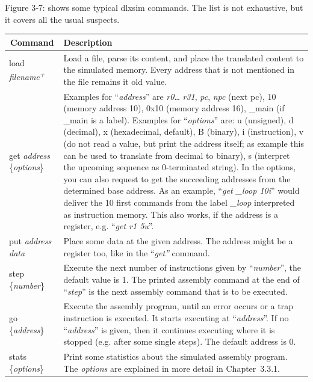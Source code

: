 Figure 3‑7: shows some typical dlxsim commands. The list is not
exhaustive, but it covers all the usual suspects.
\begin{table}[!htb]
	\centering
	\begin{tabular}{|p{3cm}|p{13cm}|}
		\hline
		\multicolumn{1}{|c|}{\textbf{Command}} & \textbf{Description}                                                               \\ \hline
		load \emph{filename\textsuperscript{+}} & Load a file, parse its
		content, and place the translated content to the simulated memory. Every
		address that is not mentioned in the file remains it old
		value.
		\\ \hline
		get \emph{address} \{\emph{options}\} & 
		Examples for ``\emph{address}'' are \emph{r0}\ldots{} \emph{r31},
		\emph{pc}, \emph{npc} (next pc), 10 (memory address 10), 0x10 (memory
		address 16), \_main (if \_main is a label).
		Examples for ``\emph{options}'' are: u (unsigned), d (decimal), x
		(hexadecimal, default), B (binary), i (instruction), v (do not read a
		value, but print the address itself; as example this can be used to
		translate from decimal to binary), s (interpret the upcoming sequence as
		0-terminated string). In the options, you can also request to get the
		succeeding addresses from the determined base address. As an example,
		``\emph{get \_loop 10i}'' would deliver the 10 first commands from the
		label \emph{\_loop} interpreted as instruction memory. This also works,
		if the address is a register, e.g. ``\emph{get r1 5u}''.\\\hline
		put \emph{address data} & Place some data at the given address. The
		address might be a register too, like in the ``\emph{get''}
		command.\\\hline
		step \{\emph{number}\} & Execute the next number of instructions given
		by ``\emph{number}'', the default value is 1. The printed assembly
		command at the end of ``\emph{step}'' is the next assembly command that
		is to be executed.\\\hline
		go \{\emph{address}\} & Execute the assembly program, until an error
		occurs or a trap instruction is executed. It starts executing at
		``\emph{address}''. If no ``\emph{address}'' is given, then it continues
		executing where it is stopped (e.g. after some single steps). The
		default address is 0.\\\hline
		stats \{\emph{options}\} & Print some statistics about the simulated
		assembly program. The \emph{options} are explained in more detail in
		Chapter~3.3.1.\\\hline

\end{tabular}
\end{table}
